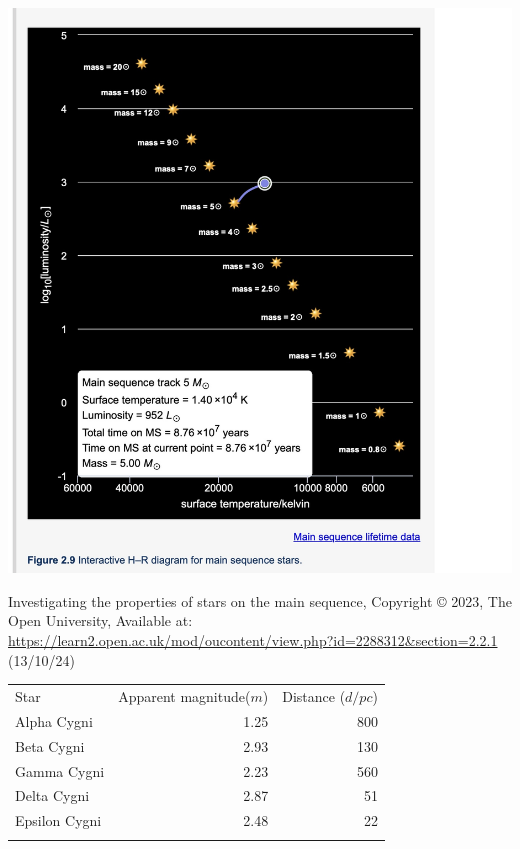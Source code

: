 \documentclass[a4paper]{tufte-handout}
\begin{document}
\begin{question}
\begin{center}
\includegraphics[scale=0.5]{screenshot.jpg}
\end{center}
Investigating the properties of stars on the main sequence, Copyright © 2023, The Open University, Available at: \url{https://learn2.open.ac.uk/mod/oucontent/view.php?id=2288312&section=2.2.1} (13/10/24)
\end{question}

\begin{question}
\begin{center}
\begin{tabular}{lrr}
\arrayrulecolor{blue!20!white}\hline
\rowcolor{blue!20!white}Star & Apparent magnitude($m$) & Distance ($d/pc$)\\
\arrayrulecolor{blue!20!white}\hline
Alpha Cygni & 1.25 & 800\\ 
\arrayrulecolor{blue!20!white}\hline
Beta Cygni & 2.93 & 130\\
\arrayrulecolor{blue!20!white}\hline
Gamma Cygni & 2.23 & 560\\
\arrayrulecolor{blue!20!white}\hline
Delta Cygni & 2.87 & 51\\
\arrayrulecolor{blue!20!white}\hline
Epsilon Cygni & 2.48 & 22\\
\arrayrulecolor{blue!20!white}\hline
\end{tabular}
\end{center}
\end{question}
\end{document}
